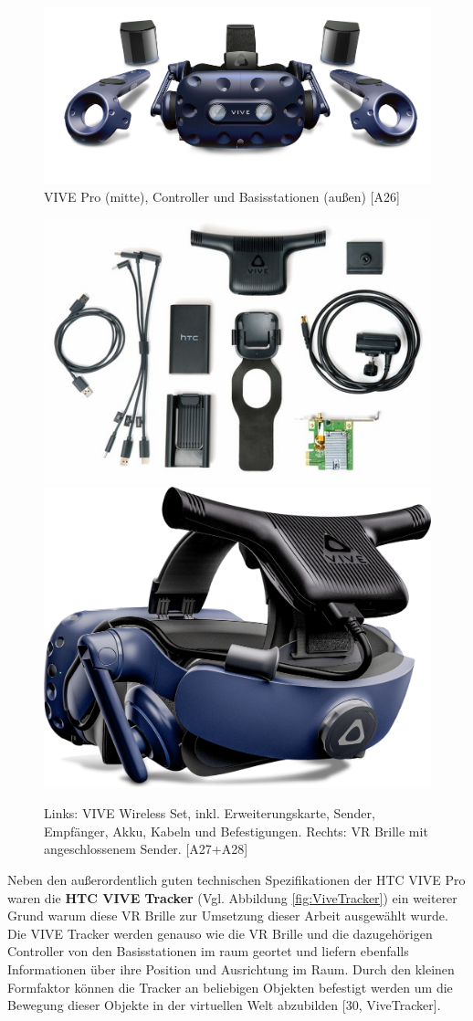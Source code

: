 \begin{figure}[h]
	\centering
	\includegraphics[width=0.7\linewidth]{Bilder/A26_Vivepro}
	\caption{VIVE Pro (mitte), Controller und Basisstationen (außen) [A26]}
	\label{fig:ViveproKit}
\end{figure}
\begin{figure}[h]
	\centering
	\includegraphics[width=0.5\linewidth]{Bilder/A27_WirelessKit}
	\includegraphics[width=0.4\linewidth]{Bilder/A28_Vive+Wireless}
	\caption{Links: VIVE Wireless Set, inkl. Erweiterungskarte, Sender, Empfänger, Akku, Kabeln und Befestigungen. Rechts: VR Brille mit angeschlossenem Sender. [A27+A28]}
	\label{fig:WirelessKit}
\end{figure}
Neben den außerordentlich guten technischen Spezifikationen der HTC VIVE Pro waren die \textbf{HTC VIVE Tracker} (Vgl. Abbildung \ref{fig:ViveTracker}) ein weiterer Grund warum diese VR Brille zur Umsetzung dieser Arbeit ausgewählt wurde. Die VIVE Tracker werden genauso wie die VR Brille und die dazugehörigen Controller von den Basisstationen im raum geortet und liefern ebenfalls Informationen über ihre Position und Ausrichtung im Raum. Durch den kleinen Formfaktor können die Tracker an beliebigen Objekten befestigt werden um die Bewegung dieser Objekte in der virtuellen Welt abzubilden [30, ViveTracker].

